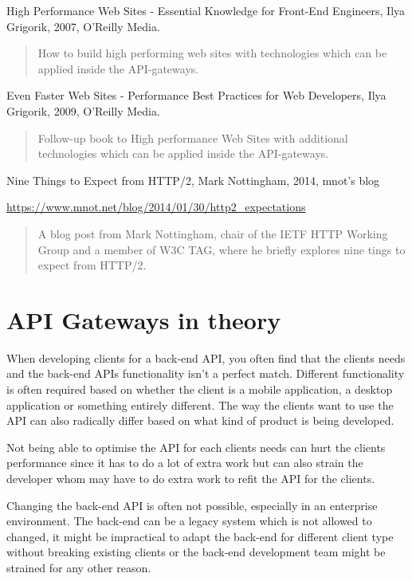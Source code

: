 \documentclass{cslthse-msc}
\begin{document}
\vspace{5mm}
\noindent High Performance Web Sites - Essential Knowledge for Front-End Engineers, Ilya Grigorik, 2007, O'Reilly Media.

\begin{quote}
	How to build high performing web sites with technologies which can be applied inside the API-gateways.
\end{quote}

\vspace{5mm}
\noindent Even Faster Web Sites - Performance Best Practices for Web Developers, Ilya Grigorik, 2009, O'Reilly Media.

\begin{quote}
	Follow-up book to High performance Web Sites with additional technologies which can be applied inside the API-gateways.
\end{quote}

\vspace{5mm}
\noindent Nine Things to Expect from HTTP/2, Mark Nottingham, 2014, mnot's blog

\noindent \url{https://www.mnot.net/blog/2014/01/30/http2_expectations}

\begin{quote}
	A blog post from Mark Nottingham, chair of the IETF HTTP Working Group and a member of W3C TAG, where he briefly explores nine tings to expect from HTTP/2.
\end{quote}

\chapter{API Gateways in theory}
When developing clients for a back-end API, you often find that the clients needs and the back-end APIs functionality isn't a perfect match. Different functionality is often required based on whether the client is a mobile application, a desktop application or something entirely different. The way the clients want to use the API can also radically differ based on what kind of product is being developed.

Not being able to optimise the API for each clients needs can hurt the clients performance since it has to do a lot of extra work but can also strain the developer whom may have to do extra work to refit the API for the clients.

Changing the back-end API is often not possible, especially in an enterprise environment. The back-end can be a legacy system which is not allowed to changed, it might be impractical to adapt the back-end for different client type without breaking existing clients or the back-end development team might be strained for any other reason.
\end{document}
